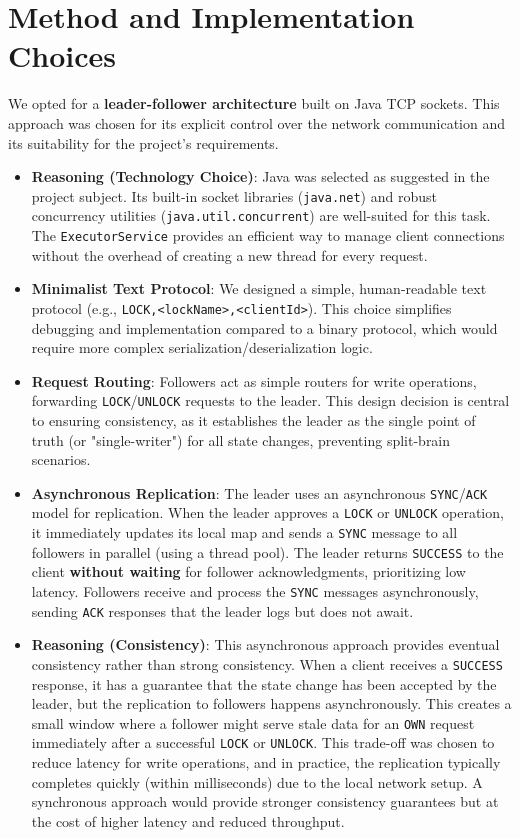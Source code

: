\documentclass[a4paper,11pt]{article}
\begin{document}
\section{Method and Implementation Choices}
We opted for a \textbf{leader-follower architecture} built on Java TCP sockets. This approach was chosen for its explicit control over the network communication and its suitability for the project's requirements.

\begin{itemize}
    \item \textbf{Reasoning (Technology Choice)}: Java was selected as suggested in the project subject. Its built-in socket libraries (\texttt{java.net}) and robust concurrency utilities (\texttt{java.util.concurrent}) are well-suited for this task. The \texttt{ExecutorService} provides an efficient way to manage client connections without the overhead of creating a new thread for every request.

    \item \textbf{Minimalist Text Protocol}: We designed a simple, human-readable text protocol (e.g., \texttt{LOCK,<lockName>,<clientId>}). This choice simplifies debugging and implementation compared to a binary protocol, which would require more complex serialization/deserialization logic.

    \item \textbf{Request Routing}: Followers act as simple routers for write operations, forwarding \texttt{LOCK}/\texttt{UNLOCK} requests to the leader. This design decision is central to ensuring consistency, as it establishes the leader as the single point of truth (or "single-writer") for all state changes, preventing split-brain scenarios.

    \item \textbf{Asynchronous Replication}: The leader uses an asynchronous \texttt{SYNC}/\texttt{ACK} model for replication. When the leader approves a \texttt{LOCK} or \texttt{UNLOCK} operation, it immediately updates its local map and sends a \texttt{SYNC} message to all followers in parallel (using a thread pool). The leader returns \texttt{SUCCESS} to the client \textbf{without waiting} for follower acknowledgments, prioritizing low latency. Followers receive and process the \texttt{SYNC} messages asynchronously, sending \texttt{ACK} responses that the leader logs but does not await.
    
    \item \textbf{Reasoning (Consistency)}: This asynchronous approach provides eventual consistency rather than strong consistency. When a client receives a \texttt{SUCCESS} response, it has a guarantee that the state change has been accepted by the leader, but the replication to followers happens asynchronously. This creates a small window where a follower might serve stale data for an \texttt{OWN} request immediately after a successful \texttt{LOCK} or \texttt{UNLOCK}. This trade-off was chosen to reduce latency for write operations, and in practice, the replication typically completes quickly (within milliseconds) due to the local network setup. A synchronous approach would provide stronger consistency guarantees but at the cost of higher latency and reduced throughput.


\end{itemize}
\end{document}
